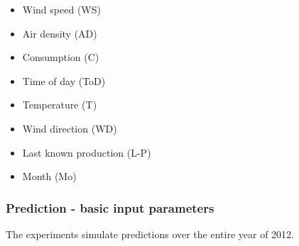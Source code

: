 \begin{itemize}
\item Wind speed (WS)
\item Air density (AD)
\item Consumption (C)
\item Time of day (ToD)
\item Temperature (T)
\item Wind direction (WD)
\item Last known production (L-P)
\item Month (Mo)
\end{itemize}

\subsubsection{Prediction - basic input parameters}
\label{sec:predictionBasicInputParams}
The experiments simulate predictions over the entire year of 2012.

